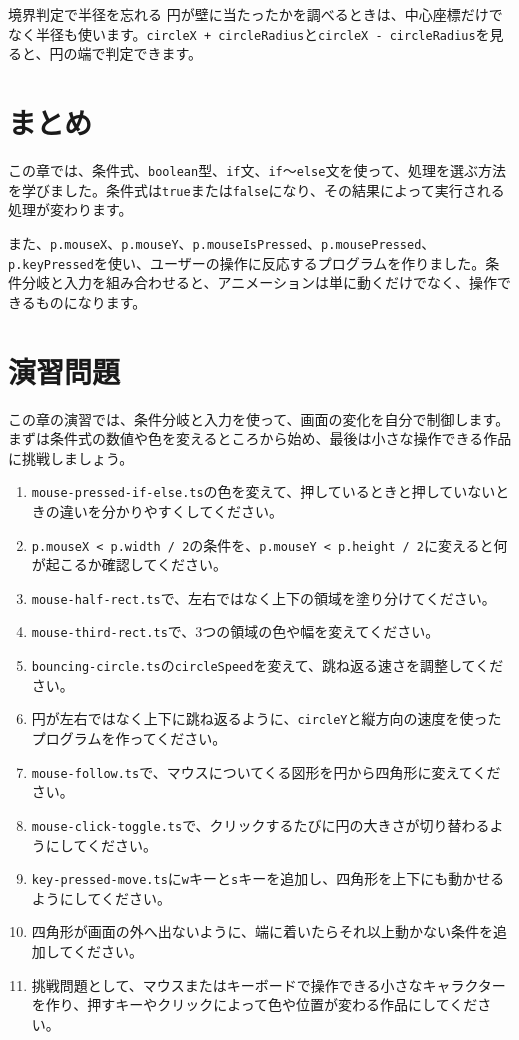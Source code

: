 \begin{mistakebox}{境界判定で半径を忘れる}
円が壁に当たったかを調べるときは、中心座標だけでなく半径も使います。\texttt{circleX + circleRadius}と\texttt{circleX - circleRadius}を見ると、円の端で判定できます。
\end{mistakebox}

\section{まとめ}

この章では、条件式、\texttt{boolean}型、\texttt{if}文、\texttt{if}〜\texttt{else}文を使って、処理を選ぶ方法を学びました。条件式は\texttt{true}または\texttt{false}になり、その結果によって実行される処理が変わります。

また、\texttt{p.mouseX}、\texttt{p.mouseY}、\texttt{p.mouseIsPressed}、\texttt{p.mousePressed}、\texttt{p.keyPressed}を使い、ユーザーの操作に反応するプログラムを作りました。条件分岐と入力を組み合わせると、アニメーションは単に動くだけでなく、操作できるものになります。

\section{演習問題}

この章の演習では、条件分岐と入力を使って、画面の変化を自分で制御します。まずは条件式の数値や色を変えるところから始め、最後は小さな操作できる作品に挑戦しましょう。

\begin{enumerate}
    \item \texttt{mouse-pressed-if-else.ts}の色を変えて、押しているときと押していないときの違いを分かりやすくしてください。
    \item \texttt{p.mouseX < p.width / 2}の条件を、\texttt{p.mouseY < p.height / 2}に変えると何が起こるか確認してください。
    \item \texttt{mouse-half-rect.ts}で、左右ではなく上下の領域を塗り分けてください。
    \item \texttt{mouse-third-rect.ts}で、3つの領域の色や幅を変えてください。
    \item \texttt{bouncing-circle.ts}の\texttt{circleSpeed}を変えて、跳ね返る速さを調整してください。
    \item 円が左右ではなく上下に跳ね返るように、\texttt{circleY}と縦方向の速度を使ったプログラムを作ってください。
    \item \texttt{mouse-follow.ts}で、マウスについてくる図形を円から四角形に変えてください。
    \item \texttt{mouse-click-toggle.ts}で、クリックするたびに円の大きさが切り替わるようにしてください。
    \item \texttt{key-pressed-move.ts}に\texttt{w}キーと\texttt{s}キーを追加し、四角形を上下にも動かせるようにしてください。
    \item 四角形が画面の外へ出ないように、端に着いたらそれ以上動かない条件を追加してください。
    \item 挑戦問題として、マウスまたはキーボードで操作できる小さなキャラクターを作り、押すキーやクリックによって色や位置が変わる作品にしてください。
\end{enumerate}
